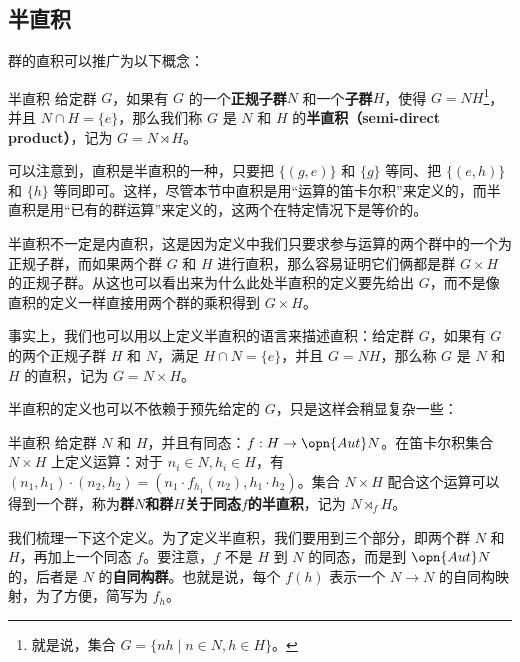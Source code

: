 \subsection{半直积}

群的直积可以推广为以下概念：

\begin{definition}{半直积}
给定群 $G$，如果有 $G$ 的一个\textbf{正规子群}$N$ 和一个\textbf{子群}$H$，使得 $G = N H$\footnote{就是说，集合 $G= \{n h \mid n \in N, h\in H\}$。}，并且 $N \cap H = \{e\}$，那么我们称 $G$ 是 $N$ 和 $H$ 的\textbf{半直积（semi-direct product）}，记为 $G = N \rtimes H$。
\end{definition}

可以注意到，直积是半直积的一种，只要把 $\{(g, e)\}$ 和 $\{g\}$ 等同、把 $\{(e, h)\}$ 和 $\{h\}$ 等同即可。这样，尽管本节中直积是用“运算的笛卡尔积”来定义的，而半直积是用“已有的群运算”来定义的，这两个在特定情况下是等价的。

半直积不一定是内直积，这是因为定义中我们只要求参与运算的两个群中的一个为正规子群，而如果两个群 $G$ 和 $H$ 进行直积，那么容易证明它们俩都是群 $G\times H$ 的正规子群。从这也可以看出来为什么此处半直积的定义要先给出 $G$，而不是像直积的定义一样直接用两个群的乘积得到 $G\times H$。

事实上，我们也可以用以上定义半直积的语言来描述直积：给定群 $G$，如果有 $G$ 的两个正规子群 $H$ 和 $N$，满足 $H\cap N=\{e\}$，并且 $G=NH$，那么称 $G$ 是 $N$ 和 $H$ 的直积，记为 $G=N\times H$。

半直积的定义也可以不依赖于预先给定的 $G$，只是这样会稍显复杂一些：

\begin{definition}{半直积}
给定群 $N$ 和 $H$，并且有同态：$f:H\rightarrow \opn{Aut}N$。在笛卡尔积集合 $N\times H$ 上定义运算：对于 $n_i\in N, h_i\in H$，有 $(n_1, h_1)\cdot(n_2, h_2)=(n_1\cdot f_{h_1}(n_2), h_1\cdot h_2)$。集合 $N\times H$ 配合这个运算可以得到一个群，称为\textbf{群}$N$\textbf{和群}$H$\textbf{关于同态}$f$\textbf{的半直积}，记为 $N\rtimes_fH$。
\end{definition}

我们梳理一下这个定义。为了定义半直积，我们要用到三个部分，即两个群 $N$ 和 $H$，再加上一个同态 $f$。要注意，$f$ 不是 $H$ 到 $N$ 的同态，而是到 $\opn{Aut} N$ 的，后者是 $N$ 的\textbf{自同构群}。也就是说，每个 $f(h)$ 表示一个 $N\rightarrow N$ 的自同构映射，为了方便，简写为 $f_h$。













